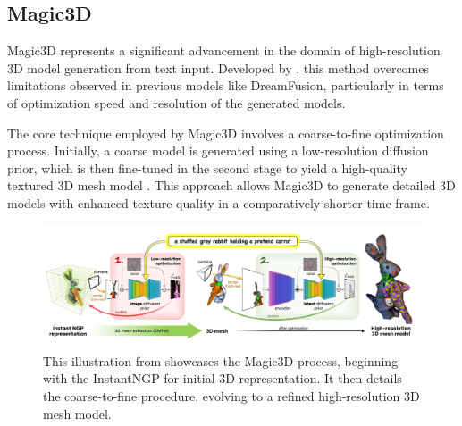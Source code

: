 
\subsection{Magic3D}\label{magic3D}

Magic3D represents a significant advancement in the domain of high-resolution 3D model generation from text input. Developed by \citeauthor{lin2023magic3d}, this method overcomes limitations observed in previous models like DreamFusion, particularly in terms of optimization speed and resolution of the generated models.

The core technique employed by Magic3D involves a coarse-to-fine optimization process. Initially, a coarse model is generated using a low-resolution diffusion prior, which is then fine-tuned in the second stage to yield a high-quality textured 3D mesh model \citep{lin2023magic3d}. This approach allows Magic3D to generate detailed 3D models with enhanced texture quality in a comparatively shorter time frame.

\begin{figure}[ht]
  \centering
    \includegraphics[width=1\columnwidth]{figures/models/Magic3D.png}
    \caption{This illustration from \citep{lin2023magic3d} showcases the Magic3D process, beginning with the InstantNGP for initial 3D representation. It then details the coarse-to-fine procedure, evolving to a refined high-resolution 3D mesh model.}\label{fig:figureMagic}
\end{figure}


